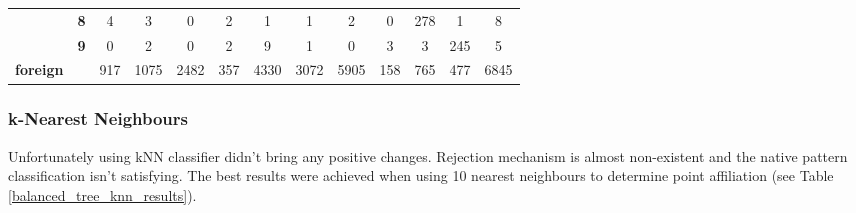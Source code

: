 \begin{table}[htp]
\begin{tabular}{|c|c|c|c|c|c|c|c|c|c|c|c|c|}
		& \textbf{8} & 4          & 3          & 0          & 2          & 1          & 1          & 2          & 0          & 278        & 1          & 8                \\ \cline{2-13} 
		& \textbf{9} & 0          & 2          & 0          & 2          & 9          & 1          & 0          & 3          & 3          & 245        & 5                \\ \hline
		\textbf{foreign}                    & \textbf{}  & 917        & 1075       & 2482       & 357        & 4330       & 3072       & 5905       & 158        & 765        & 477        & 6845             \\ \hline
	\end{tabular}
\end{table}

\subsubsection{k-Nearest Neighbours}

Unfortunately using kNN classifier didn't bring any positive changes. Rejection mechanism is almost non-existent and the native pattern classification isn't satisfying. The best results were achieved when using 10 nearest neighbours to determine point affiliation (see Table \ref{balanced_tree_knn_results}).

